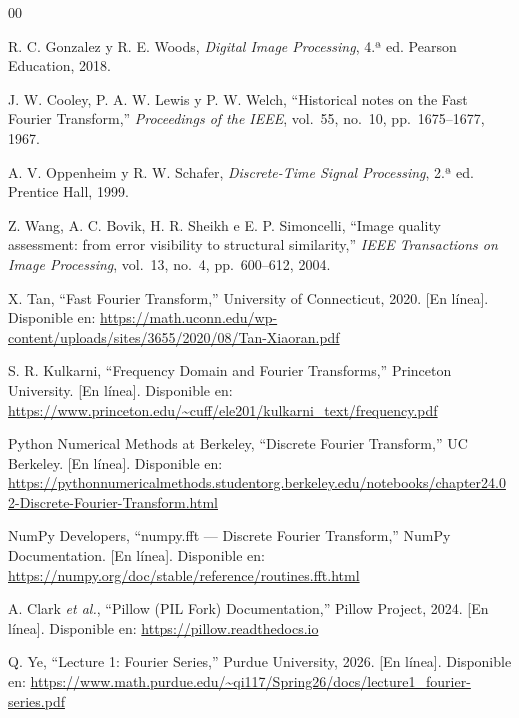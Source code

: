 \documentclass[conference]{IEEEtran}
\begin{document}
\begin{thebibliography}{00}

R. C. Gonzalez y R. E. Woods, \textit{Digital Image Processing}, 4.ª ed.
Pearson Education, 2018.

J. W. Cooley, P. A. W. Lewis y P. W. Welch, ``Historical notes on the Fast
Fourier Transform,'' \textit{Proceedings of the IEEE}, vol.~55, no.~10,
pp.~1675--1677, 1967.

A. V. Oppenheim y R. W. Schafer, \textit{Discrete-Time Signal Processing},
2.ª ed. Prentice Hall, 1999.

Z. Wang, A. C. Bovik, H. R. Sheikh e E. P. Simoncelli, ``Image quality
assessment: from error visibility to structural similarity,''
\textit{IEEE Transactions on Image Processing}, vol.~13, no.~4,
pp.~600--612, 2004.

X. Tan, ``Fast Fourier Transform,'' University of Connecticut, 2020.
[En línea]. Disponible en:
\url{https://math.uconn.edu/wp-content/uploads/sites/3655/2020/08/Tan-Xiaoran.pdf}

S. R. Kulkarni, ``Frequency Domain and Fourier Transforms,''
Princeton University. [En línea]. Disponible en:
\url{https://www.princeton.edu/~cuff/ele201/kulkarni_text/frequency.pdf}

Python Numerical Methods at Berkeley, ``Discrete Fourier Transform,''
UC Berkeley. [En línea]. Disponible en:
\url{https://pythonnumericalmethods.studentorg.berkeley.edu/notebooks/chapter24.02-Discrete-Fourier-Transform.html}

NumPy Developers, ``numpy.fft --- Discrete Fourier Transform,''
NumPy Documentation. [En línea]. Disponible en:
\url{https://numpy.org/doc/stable/reference/routines.fft.html}

A. Clark \textit{et al.}, ``Pillow (PIL Fork) Documentation,''
Pillow Project, 2024. [En línea]. Disponible en:
\url{https://pillow.readthedocs.io}

Q. Ye, ``Lecture 1: Fourier Series,'' Purdue University, 2026.
[En línea]. Disponible en:
\url{https://www.math.purdue.edu/~qi117/Spring26/docs/lecture1_fourier-series.pdf}

\end{thebibliography}
\end{document}
